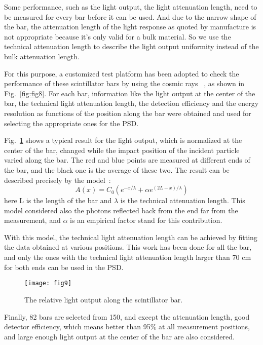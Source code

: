 \documentclass[preprint]{elsarticle}
\begin{document}
Some performance, such as the light output, the light attenuation length, need to be measured for every bar before it can be used. And due to the narrow shape of the bar, the attenuation length of the light response as quoted by manufacture is not appropriate because it’s only valid for a bulk material. So we use the technical attenuation length to describe the light output uniformity instead of the bulk attenuation length.

For this purpose, a customized test platform has been adopted to check the performance of these scintillator bars by using the cosmic rays ~\cite{zhang2015}, as shown in Fig.~\ref{fig:fig8}. For each bar, information like the light output at the center of the bar, the technical light attenuation length, the detection efficiency and the energy resolution as functions of the position along the bar were obtained and used for selecting the appropriate ones for the PSD.

Fig.~\ref{fig:fig9} shows a typical result for the light output, which is normalized at the center of the bar, changed while the impact position of the incident particle varied along the bar. The red and blue points are measured at different ends of the bar, and the black one is the average of these two. The result can be described precisely by the model~\cite{taiuti}:
\begin{equation}
A(x)=C_0(e^{-x/\lambda} + \alpha e^{(2L-x)/\lambda})
\end{equation}
here L is the length of the bar and $\lambda$ is the technical attenuation length. This model considered also the photons reflected back from the end far from the measurement, and $\alpha$ is an empirical factor stand for this contribution.

With this model, the technical light attenuation length can be achieved by fitting the data obtained at various positions. This work has been done for all the bar, and only the ones with the technical light attenuation length larger than 70 cm for both ends can be used in the PSD.

\begin{figure}
 \centering
 \texttt{[image: fig9]}
\caption{The relative light output along the scintillator bar.}
\label{fig:fig9}
\end{figure}

Finally, 82 bars are selected from 150, and except the attenuation length, good detector efficiency, which means better than 95\% at all measurement positions, and large enough light output at the center of the bar are also considered.
\end{document}
